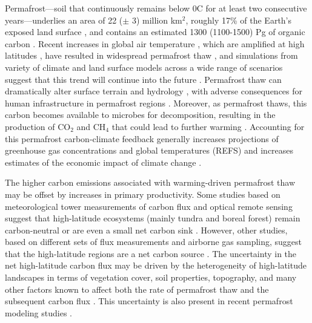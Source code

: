 \documentclass[essd, manuscript]{copernicus}
\begin{document}
\introduction
Permafrost---soil that continuously remains below 0\degree C for at least two consecutive years---underlies an area of 22 ($\pm$ 3) million km$^2$, roughly 17\% of the Earth's exposed land surface \citep{gruber_2012_derivation}, and contains an estimated 1300 (1100-1500) Pg of organic carbon \citep{hugelius_2014_estimated}.
Recent increases in global air temperature \citep{stocker_2013_climate}, which are amplified at high latitudes \citep{pithan_2014_arctic}, have resulted in widespread permafrost thaw \citep{romanovsky_2010_permafrost}, and simulations from variety of climate and land surface models across a wide range of scenarios suggest that this trend will continue into the future \citep{koven_2013_analysis, chadburn_2017_observation}.
Permafrost thaw can dramatically alter surface terrain and hydrology \citep{jones_2013_quantifying, godin_2014_effects, necsoiu_2013_multi-temporal}, with adverse consequences for human infrastructure in permafrost regions \citep{anisimov_1997_permafrost, nelson_2002_climate, larsen_2008_estimating}.
Moreover, as permafrost thaws, this carbon becomes available to microbes for decomposition, resulting in the production of CO$_2$ and CH$_4$ \citep{brown_2008_report, romanovsky_2010_thermal, bond-lamberty_2016_temperature} that could lead to further warming \citep{koven_2011_permafrost, schuur_2015_climate}. Accounting for this permafrost carbon-climate feedback generally increases projections of greenhouse gas concentrations and global temperatures (REFS) and increases estimates of the economic impact of climate change \citep{hope_2015_economic, yumashev_2019_climate, chen_2019_economic}.

The higher carbon emissions associated with warming-driven permafrost thaw may be offset by increases in primary productivity.
Some studies based on meteorological tower measurements of carbon flux and optical remote sensing suggest that high-latitude ecosystems (mainly tundra and boreal forest) remain carbon-neutral or are even a small net carbon sink \citep{mcguire_2012_assessment, welp_2016_increasing}.
However, other studies, based on different sets of flux measurements and airborne gas sampling, suggest that the high-latitude regions are a net carbon source \citep{belshe_2013_tundra, commane_2017_carbon, natali_2019_large}.
The uncertainty in the net high-latitude carbon flux may be driven by the heterogeneity of high-latitude landscapes in terms of vegetation cover, soil properties, topography, and many other factors known to affect both the rate of permafrost thaw and the subsequent carbon flux \citep{turetsky_2002_boreal, wickland_2006_effects, lund_2010_variability, james_2013_multi-decadal, johnson_2013_permafrost, grant_2019_modeling1, grant_2019_modeling2}.
This uncertainty is also present in recent permafrost modeling studies \citep{burke_2017_quantifying, qian_2010_enhanced, ito_2016_impacts, harp_2016_effect}.
\end{document}
